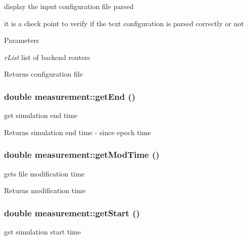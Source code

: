 display the input configuration file parsed 

it is a check point to verify if the text configuration is parsed correctly or not 
\begin{DoxyParams}{Parameters}
\item[{\em rList}]list of backend routers \end{DoxyParams}
\begin{DoxyReturn}{Returns}
configuration file 
\end{DoxyReturn}
\hypertarget{classmeasurement_a48411dc4fa236d3101ae2ab4c09eebb6}{
\subsubsection[{getEnd}]{\setlength{\rightskip}{0pt plus 5cm}double measurement::getEnd ()}}
\label{classmeasurement_a48411dc4fa236d3101ae2ab4c09eebb6}


get simulation end time 

\begin{DoxyReturn}{Returns}
simulation end time -\/ since epoch time 
\end{DoxyReturn}
\hypertarget{classmeasurement_a5e02e77e794e62cef5639ad02453ae12}{
\subsubsection[{getModTime}]{\setlength{\rightskip}{0pt plus 5cm}double measurement::getModTime ()}}
\label{classmeasurement_a5e02e77e794e62cef5639ad02453ae12}


gets file modification time 

\begin{DoxyReturn}{Returns}
modification time 
\end{DoxyReturn}
\hypertarget{classmeasurement_a0c29e12029b98174f084e9485c67c10c}{
\subsubsection[{getStart}]{\setlength{\rightskip}{0pt plus 5cm}double measurement::getStart ()}}
\label{classmeasurement_a0c29e12029b98174f084e9485c67c10c}


get simulation start time 

